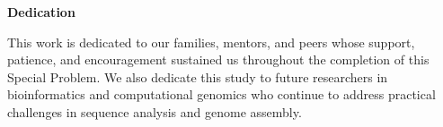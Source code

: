
\begin{center}
\textbf{Dedication}
\end{center}

This work is dedicated to our families, mentors, and peers whose support, patience, and encouragement sustained us throughout the completion of this Special Problem. We also dedicate this study to future researchers in bioinformatics and computational genomics who continue to address practical challenges in sequence analysis and genome assembly.